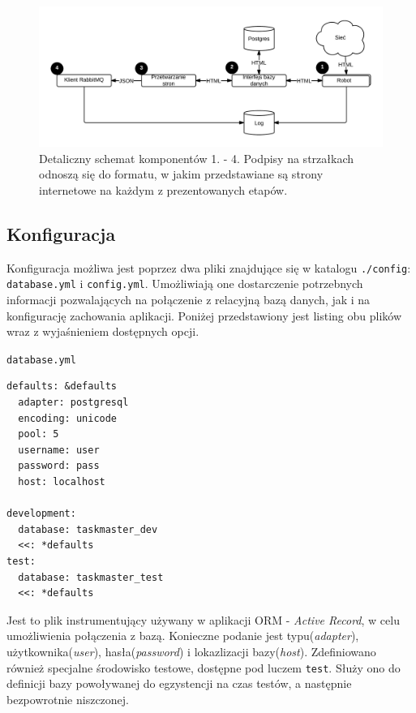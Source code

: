 \begin{figure}[!h]
    \centering
    \label{graph:mri}
    \includegraphics[scale=0.22]{mri}
    \caption{Detaliczny schemat komponentów 1. - 4. Podpisy na strzałkach odnoszą się do formatu, w jakim przedstawiane są strony internetowe na każdym z prezentowanych etapów. }
\end{figure}

\subsection{Konfiguracja}
\label{subs:konfiguracjaMri}

Konfiguracja możliwa jest poprzez dwa pliki znajdujące się w katalogu \texttt{./config}: \texttt{database.yml} i \texttt{config.yml}. Umożliwiają one dostarczenie potrzebnych
informacji pozwalających na połączenie z relacyjną bazą danych, jak i na konfigurację zachowania aplikacji. Poniżej przedstawiony jest listing obu plików 
wraz z wyjaśnieniem dostępnych opcji.

\texttt{database.yml}

\lstset{language=ruby}
\begin{lstlisting}[frame=single]
defaults: &defaults
  adapter: postgresql
  encoding: unicode
  pool: 5
  username: user
  password: pass
  host: localhost

development:
  database: taskmaster_dev
  <<: *defaults
test:
  database: taskmaster_test
  <<: *defaults

\end{lstlisting}

Jest to plik instrumentujący używany w aplikacji ORM - \emph{Active Record}, w celu umożliwienia połączenia z bazą. Konieczne podanie jest typu(\emph{adapter}), 
użytkownika(\emph{user}), hasła(\emph{password}) i lokazlizacji bazy(\emph{host}). Zdefiniowano również specjalne środowisko testowe, dostępne pod luczem \texttt{test}.
Służy ono do definicji bazy powoływanej do egzystencji na czas testów, a następnie bezpowrotnie niszczonej. 

